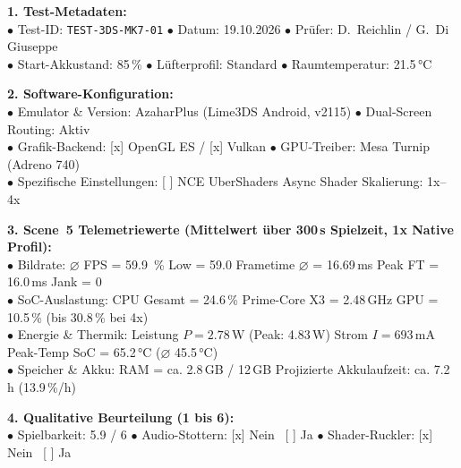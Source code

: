 \documentclass[12pt,a4paper]{scrartcl}
\begin{document}
\begin{tcolorbox}[colback=boxBg, colframe=boxBorder, arc=2mm, title={\textbf{Messprotokoll 1: Nintendo 3DS -- Mario Kart 7}}]
    \small
    \textbf{1. Test-Metadaten:}\\
    $\bullet$ Test-ID: \texttt{TEST-3DS-MK7-01} \quad $\bullet$ Datum: 19.10.2026 \quad $\bullet$ Prüfer: D.~Reichlin / G.~Di Giuseppe\\
    $\bullet$ Start-Akkustand: 85\,\% \quad $\bullet$ Lüfterprofil: Standard \quad $\bullet$ Raumtemperatur: 21.5\,°C

    \medskip
    \textbf{2. Software-Konfiguration:}\\
    $\bullet$ Emulator \& Version: AzaharPlus (Lime3DS Android, v2115) \quad $\bullet$ Dual-Screen Routing: Aktiv\\
    $\bullet$ Grafik-Backend: [x] OpenGL ES / [x] Vulkan \qquad $\bullet$ GPU-Treiber: Mesa Turnip (Adreno 740)\\
    $\bullet$ Spezifische Einstellungen: [ ] NCE \quad [ ] UberShaders \quad [x] Async Shader \quad Skalierung: 1x--4x

    \medskip
    \textbf{3. Scene~5 Telemetriewerte (Mittelwert über 300\,s Spielzeit, 1x Native Profil):}\\
    $\bullet$ Bildrate: $\varnothing$ FPS = 59.9 \,\% Low = 59.0 \quad Frametime $\varnothing$ = 16.69\,ms \quad Peak FT = 16.0\,ms \quad Jank = 0\\
    $\bullet$ SoC-Auslastung: CPU Gesamt = 24.6\,\% \quad Prime-Core X3 = 2.48\,GHz \quad GPU = 10.5\,\% (bis 30.8\,\% bei 4x)\\
    $\bullet$ Energie \& Thermik: Leistung $P = 2.78$\,W (Peak: 4.83\,W) \quad Strom $I = 693$\,mA \quad Peak-Temp SoC = 65.2\,°C ($\varnothing$ 45.5\,°C)\\
    $\bullet$ Speicher \& Akku: RAM = ca. 2.8\,GB / 12\,GB \quad Projizierte Akkulaufzeit: ca. 7.2\,h (13.9\,\%/h)

    \medskip
    \textbf{4. Qualitative Beurteilung (1 bis 6):}\\
    $\bullet$ Spielbarkeit: 5.9 / 6 \quad $\bullet$ Audio-Stottern: [x] Nein \ [ ] Ja \quad $\bullet$ Shader-Ruckler: [x] Nein \ [ ] Ja
\end{tcolorbox}
\end{document}
